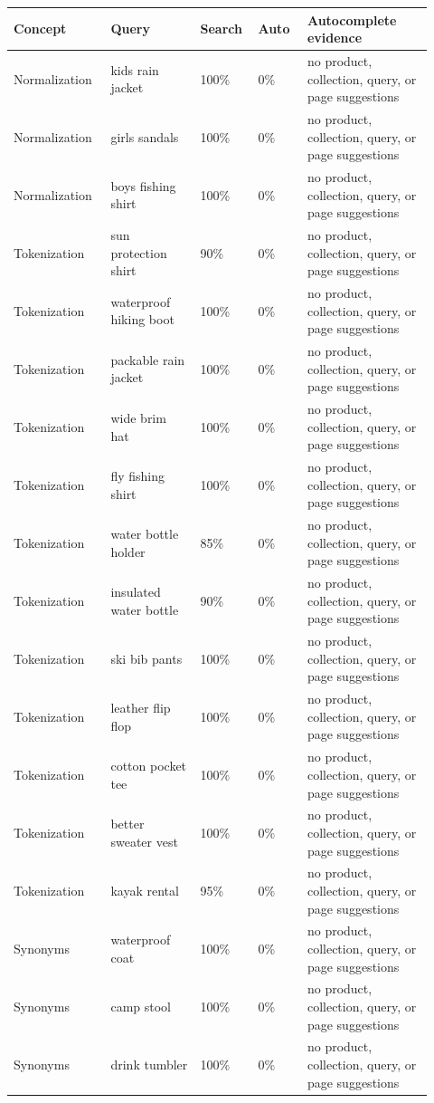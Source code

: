 \documentclass[10pt]{article}
\begin{document}
{\fontsize{7.6}{8.9}\selectfont
\begin{longtable}{@{}L{0.21\linewidth}L{0.20\linewidth}R{0.11\linewidth}R{0.11\linewidth}L{0.29\linewidth}@{}}
\toprule
\textbf{Concept} & \textbf{Query} & \textbf{Search} & \textbf{Auto} & \textbf{Autocomplete evidence}\\
\midrule
\endhead
Normalization & kids rain jacket & 100\% & 0\% & no product, collection, query, or page suggestions\\
Normalization & girls sandals & 100\% & 0\% & no product, collection, query, or page suggestions\\
Normalization & boys fishing shirt & 100\% & 0\% & no product, collection, query, or page suggestions\\
Tokenization & sun protection shirt & 90\% & 0\% & no product, collection, query, or page suggestions\\
Tokenization & waterproof hiking boot & 100\% & 0\% & no product, collection, query, or page suggestions\\
Tokenization & packable rain jacket & 100\% & 0\% & no product, collection, query, or page suggestions\\
Tokenization & wide brim hat & 100\% & 0\% & no product, collection, query, or page suggestions\\
Tokenization & fly fishing shirt & 100\% & 0\% & no product, collection, query, or page suggestions\\
Tokenization & water bottle holder & 85\% & 0\% & no product, collection, query, or page suggestions\\
Tokenization & insulated water bottle & 90\% & 0\% & no product, collection, query, or page suggestions\\
Tokenization & ski bib pants & 100\% & 0\% & no product, collection, query, or page suggestions\\
Tokenization & leather flip flop & 100\% & 0\% & no product, collection, query, or page suggestions\\
Tokenization & cotton pocket tee & 100\% & 0\% & no product, collection, query, or page suggestions\\
Tokenization & better sweater vest & 100\% & 0\% & no product, collection, query, or page suggestions\\
Tokenization & kayak rental & 95\% & 0\% & no product, collection, query, or page suggestions\\
Synonyms & waterproof coat & 100\% & 0\% & no product, collection, query, or page suggestions\\
Synonyms & camp stool & 100\% & 0\% & no product, collection, query, or page suggestions\\
Synonyms & drink tumbler & 100\% & 0\% & no product, collection, query, or page suggestions\\
\bottomrule
\end{longtable}
}
\end{document}

